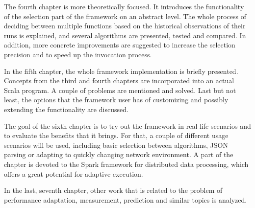 The fourth chapter is more theoretically focused. It introduces the functionality of the selection part of the framework on an abstract level. The whole process of deciding between multiple functions based on the historical observations of their runs is explained, and several algorithms are presented, tested and compared. In addition, more concrete improvements are suggested to increase the selection precision and to speed up the invocation process.

In the fifth chapter, the whole framework implementation is briefly presented. Concepts from the third and fourth chapters are incorporated into an actual Scala program. A couple of problems are mentioned and solved. Last but not least, the options that the framework user has of customizing and possibly extending the functionality are discussed.

The goal of the sixth chapter is to try out the framework in real-life scenarios and to evaluate the benefits that it brings. For that, a couple of different usage scenarios will be used, including basic selection between algorithms, JSON parsing or adapting to quickly changing network environment. A part of the chapter is devoted to the Spark framework for distributed data processing, which offers a great potential for adaptive execution.

In the last, seventh chapter, other work that is related to the problem of performance adaptation, measurement, prediction and similar topics is analyzed.